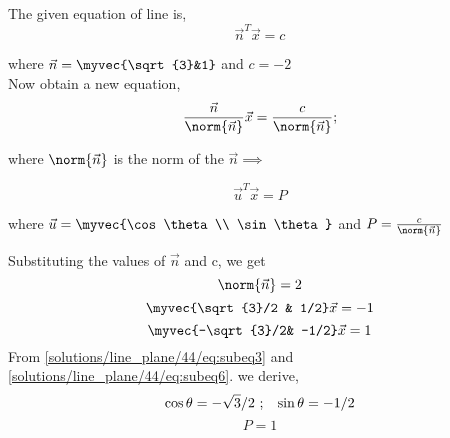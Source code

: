 
The given equation of line is,
\begin{equation}\label{eq:solutions/line_plane/44/eq1}
		\vec{n}^T\vec{x} = c
\end{equation}

where $ \vec{n} = \myvec{\sqrt{3}&1}$ and $c = -2 $
		\\
Now obtain a new equation,
\begin{equation}
\frac{\vec{n}}{\norm{\vec{n}}}\vec{x}= \frac{c}{\norm{\vec{n}}};
\end{equation}

where $ \norm{\vec{n}}$ is the norm of the $\vec{n}\implies $

 \begin{equation}\label{eq:solutions/line_plane/44/eq:subeq3}
   \vec{u}^T\vec{x} = P
\end{equation}

where $\vec{u} = \myvec{\cos \theta  \\   \sin \theta}$ and $ P = \frac{c}{\norm{\vec{n}}}$

Substituting the values of $\vec{n}$ and c, we get
\begin{equation}\label{eq:solutions/line_plane/44/eq:subeq4}
		\norm{\vec{n}} = 2
\end{equation}
\begin{equation}\label{eq:solutions/line_plane/44/eq:subeq5}
		\myvec{\sqrt{3}/2 & 1/2}\vec{x} = -1
\end{equation}
\begin{equation}\label{eq:solutions/line_plane/44/eq:subeq6}
		\myvec{-\sqrt{3}/2& -1/2}\vec{x} = 1		
\end{equation}	
From \eqref{solutions/line_plane/44/eq:subeq3} and \eqref{solutions/line_plane/44/eq:subeq6}. we derive,
\begin{equation}
		\cos\theta = -\sqrt{3}/2\ ;\hspace{3mm} \sin\theta = -1/2
\end{equation}
\begin{equation}
		 P = 1
\end{equation}
